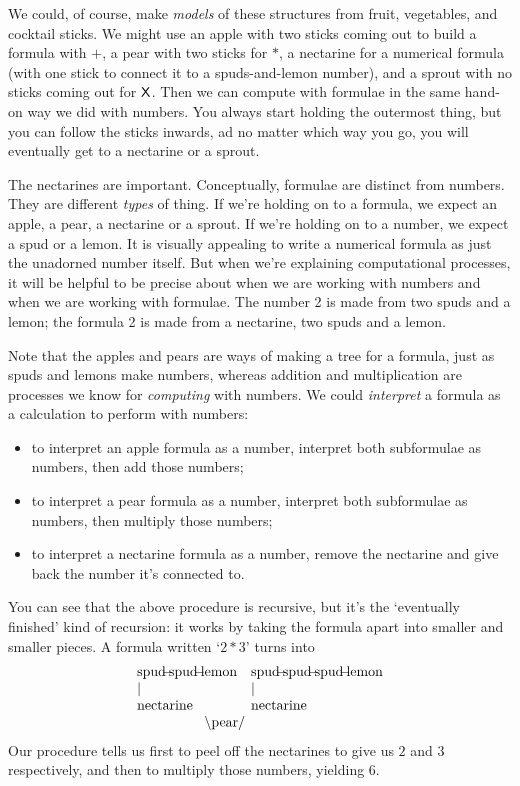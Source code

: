 \documentclass{book}
\begin{document}
We could, of course, make \emph{models} of these structures from fruit, vegetables, and cocktail sticks. We might use an apple with two sticks coming out to build a formula with $+$, a pear with two sticks for $*$, a nectarine for a numerical formula (with one stick to connect it to a spuds-and-lemon number), and a sprout with no sticks coming out for $\mathsf{X}$. Then we can compute with formulae in the same hand-on way we did with numbers. You always start holding the outermost thing, but you can follow the sticks inwards, ad no matter which way you go, you will eventually get to a nectarine or a sprout.

The nectarines are important. Conceptually, formulae are distinct from numbers. They are different \emph{types} of thing. If we're holding on to a formula, we expect an apple, a pear, a nectarine or a sprout. If we're holding on to a number, we expect a spud or a lemon. It is visually appealing to write a numerical formula as just the unadorned number itself. But when we're explaining computational processes, it will be helpful to be precise about when we are working with numbers and when we are working with formulae. The number 2 is made from two spuds and a lemon; the formula 2 is made from a nectarine, two spuds and a lemon.

Note that the apples and pears are ways of making a tree for a formula, just as spuds and lemons make numbers, whereas addition and multiplication are processes we know for \emph{computing} with numbers. We could \emph{interpret} a formula as a calculation to perform with numbers:
\begin{itemize}
\item to interpret an apple formula as a number, interpret both subformulae as numbers, then add those numbers;
\item to interpret a pear formula as a number, interpret both subformulae as numbers, then multiply those numbers;
\item to interpret a nectarine formula as a number, remove the nectarine and give back the number it's connected to.
\end{itemize}
You can see that the above procedure is recursive, but it's the `eventually finished' kind of recursion: it works by taking the formula apart into smaller and smaller pieces. A formula written `$2*3$' turns into
\[\begin{array}{l@{\quad}l}
\spud\spud\lemon & \spud\spud\spud\lemon \\
| & | \\
\mbox{nectarine} & \mbox{nectarine} \\
\multicolumn{2}{c}{\backslash\mbox{pear}/\hspace*{0.7in}}
\end{array}\]
Our procedure tells us first to peel off the nectarines to give us $2$ and $3$ respectively, and then to multiply those numbers, yielding 6.
\end{document}
